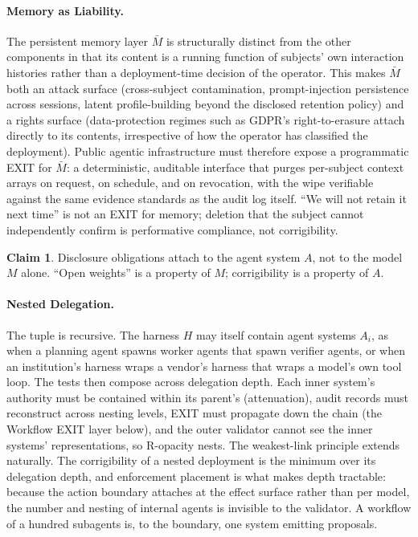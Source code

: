 \documentclass{article}
\theoremstyle{definition}
\newtheorem{claim}{Claim}[section]
\begin{document}
\paragraph{Memory as Liability.} The persistent memory layer $\bar{M}$ is structurally distinct from the other components in that its content is a running function of subjects' own interaction histories rather than a deployment-time decision of the operator. This makes $\bar{M}$ both an attack surface (cross-subject contamination, prompt-injection persistence across sessions, latent profile-building beyond the disclosed retention policy) and a rights surface (data-protection regimes such as GDPR's right-to-erasure attach directly to its contents, irrespective of how the operator has classified the deployment). Public agentic infrastructure must therefore expose a programmatic EXIT for $\bar{M}$: a deterministic, auditable interface that purges per-subject context arrays on request, on schedule, and on revocation, with the wipe verifiable against the same evidence standards as the audit log itself. ``We will not retain it next time'' is not an EXIT for memory; deletion that the subject cannot independently confirm is performative compliance, not corrigibility.

\begin{claim}
\label{claim:system-not-model}
Disclosure obligations attach to the agent system $A$, not to the model $M$ alone. ``Open weights'' is a property of $M$; corrigibility is a property of $A$.
\end{claim}

\paragraph{Nested Delegation.} The tuple is recursive. The harness $H$ may itself contain agent systems $A_i$, as when a planning agent spawns worker agents that spawn verifier agents, or when an institution's harness wraps a vendor's harness that wraps a model's own tool loop. The tests then compose across delegation depth. Each inner system's authority must be contained within its parent's (attenuation), audit records must reconstruct across nesting levels, EXIT must propagate down the chain (the Workflow EXIT layer below), and the outer validator cannot see the inner systems' representations, so R-opacity nests. The weakest-link principle extends naturally. The corrigibility of a nested deployment is the minimum over its delegation depth, and enforcement placement is what makes depth tractable: because the action boundary attaches at the effect surface rather than per model, the number and nesting of internal agents is invisible to the validator. A workflow of a hundred subagents is, to the boundary, one system emitting proposals.
\end{document}

